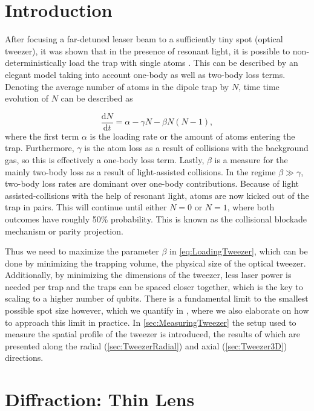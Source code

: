 \section{Introduction}\label{sec:LoadingAtoms}

After focusing a far-detuned leaser beam to a sufficiently tiny spot (optical tweezer), it was shown that in the presence of resonant light, it is possible to non-deterministically load the trap with single atoms \cite{Schlosser2001}.
This can be described by an elegant model taking into account one-body as well as two-body loss terms. 
Denoting the average number of atoms in the dipole trap by $N$, time time evolution of $N$ can be described as \cite{Schlosser2002} 

\begin{equation}\label{eq:LoadingTweezer}
	\frac{\text{d}N}{\text{d}t} = \alpha - \gamma N - \beta N(N-1),
\end{equation}
where the first term $\alpha$ is the loading rate or the amount of atoms entering the trap.
Furthermore, $\gamma$ is the atom loss as a result of collisions with the background gas, so this is effectively a one-body loss term.
Lastly, $\beta$ is a measure for the mainly two-body loss as a result of light-assisted collisions.
In the regime $\beta \gg \gamma$, two-body loss rates are dominant over one-body contributions. 
Because of light assisted-collisions with the help of resonant light, atoms are now kicked out of the trap in pairs.
This will continue until either $N=0$ or $N=1$, where both outcomes have roughly 50\% probability.
This is known as the collisional blockade mechanism \cite{Schlosser2001} or parity projection.

Thus we need to maximize the parameter $\beta$ in \cref{eq:LoadingTweezer}, which can be done by minimizing the trapping volume, the physical size of the optical tweezer.
Additionally, by minimizing the dimensions of the tweezer, less laser power is needed per trap and the traps can be spaced closer together, which is the key to scaling to a higher number of qubits.
There is a fundamental limit to the smallest possible spot size however, which we quantify in , where we also elaborate on how to approach this limit in practice.
In \cref{sec:MeasuringTweezer} the setup used to measure the spatial profile of the tweezer is introduced, the results of which are presented along the radial (\cref{sec:TweezerRadial}) and axial (\cref{sec:Tweezer3D}) directions.

\section{Diffraction: Thin Lens}\label{sec:DiffractionLimit}

